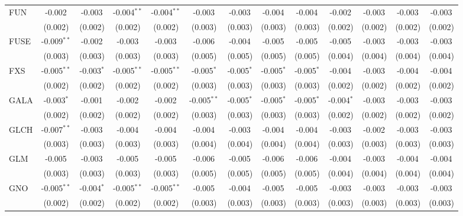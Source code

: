\begin{table}[!htbp]
\begin{tabular}{@{\extracolsep{5pt}}lcccccccccccc}
 FUN & -0.002$^{}$ & -0.003$^{}$ & -0.004$^{**}$ & -0.004$^{**}$ & -0.003$^{}$ & -0.003$^{}$ & -0.004$^{}$ & -0.004$^{}$ & -0.002$^{}$ & -0.003$^{}$ & -0.003$^{}$ & -0.003$^{}$ \\
  & (0.002) & (0.002) & (0.002) & (0.002) & (0.003) & (0.003) & (0.003) & (0.003) & (0.002) & (0.002) & (0.002) & (0.002) \\
 FUSE & -0.009$^{**}$ & -0.002$^{}$ & -0.003$^{}$ & -0.003$^{}$ & -0.006$^{}$ & -0.004$^{}$ & -0.005$^{}$ & -0.005$^{}$ & -0.005$^{}$ & -0.003$^{}$ & -0.003$^{}$ & -0.003$^{}$ \\
  & (0.003) & (0.003) & (0.003) & (0.003) & (0.005) & (0.005) & (0.005) & (0.005) & (0.004) & (0.004) & (0.004) & (0.004) \\
 FXS & -0.005$^{**}$ & -0.003$^{*}$ & -0.005$^{**}$ & -0.005$^{**}$ & -0.005$^{*}$ & -0.005$^{*}$ & -0.005$^{*}$ & -0.005$^{*}$ & -0.004$^{}$ & -0.003$^{}$ & -0.004$^{}$ & -0.004$^{}$ \\
  & (0.002) & (0.002) & (0.002) & (0.002) & (0.003) & (0.003) & (0.003) & (0.003) & (0.002) & (0.002) & (0.002) & (0.002) \\
 GALA & -0.003$^{*}$ & -0.001$^{}$ & -0.002$^{}$ & -0.002$^{}$ & -0.005$^{**}$ & -0.005$^{*}$ & -0.005$^{*}$ & -0.005$^{*}$ & -0.004$^{*}$ & -0.003$^{}$ & -0.003$^{}$ & -0.003$^{}$ \\
  & (0.002) & (0.002) & (0.002) & (0.002) & (0.003) & (0.003) & (0.003) & (0.003) & (0.002) & (0.002) & (0.002) & (0.002) \\
 GLCH & -0.007$^{**}$ & -0.003$^{}$ & -0.004$^{}$ & -0.004$^{}$ & -0.004$^{}$ & -0.003$^{}$ & -0.004$^{}$ & -0.004$^{}$ & -0.003$^{}$ & -0.002$^{}$ & -0.003$^{}$ & -0.003$^{}$ \\
  & (0.003) & (0.003) & (0.003) & (0.003) & (0.004) & (0.004) & (0.004) & (0.004) & (0.003) & (0.003) & (0.003) & (0.003) \\
 GLM & -0.005$^{}$ & -0.003$^{}$ & -0.005$^{}$ & -0.005$^{}$ & -0.006$^{}$ & -0.005$^{}$ & -0.006$^{}$ & -0.006$^{}$ & -0.004$^{}$ & -0.003$^{}$ & -0.004$^{}$ & -0.004$^{}$ \\
  & (0.003) & (0.003) & (0.003) & (0.003) & (0.005) & (0.005) & (0.005) & (0.005) & (0.004) & (0.004) & (0.004) & (0.004) \\
 GNO & -0.005$^{**}$ & -0.004$^{*}$ & -0.005$^{**}$ & -0.005$^{**}$ & -0.005$^{}$ & -0.004$^{}$ & -0.005$^{}$ & -0.005$^{}$ & -0.003$^{}$ & -0.003$^{}$ & -0.003$^{}$ & -0.003$^{}$ \\
  & (0.002) & (0.002) & (0.002) & (0.002) & (0.003) & (0.003) & (0.003) & (0.003) & (0.003) & (0.003) & (0.003) & (0.003) \\

\end{tabular}
\end{table}
